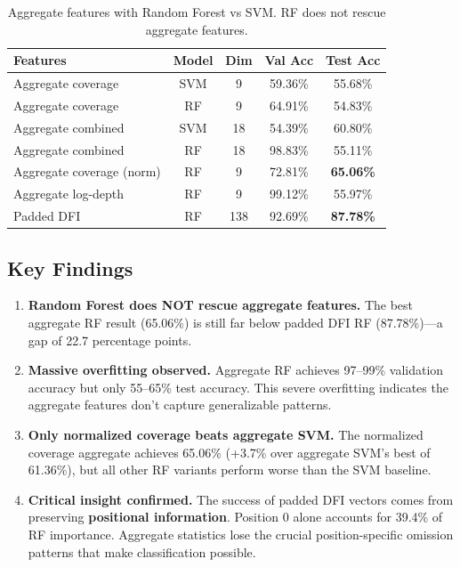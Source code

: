 \documentclass[12pt,a4paper]{article}
\begin{document}
\begin{table}[h]
\centering
\small
\begin{tabular}{lcccc}
\hline
\textbf{Features} & \textbf{Model} & \textbf{Dim} & \textbf{Val Acc} & \textbf{Test Acc} \\
\hline
Aggregate coverage & SVM & 9 & 59.36\% & 55.68\% \\
Aggregate coverage & RF & 9 & 64.91\% & 54.83\% \\
Aggregate combined & SVM & 18 & 54.39\% & 60.80\% \\
Aggregate combined & RF & 18 & 98.83\% & 55.11\% \\
Aggregate coverage (norm) & RF & 9 & 72.81\% & \textbf{65.06\%} \\
Aggregate log-depth & RF & 9 & 99.12\% & 55.97\% \\
\midrule
Padded DFI & RF & 138 & 92.69\% & \textbf{87.78\%} \\
\hline
\end{tabular}
\caption{Aggregate features with Random Forest vs SVM. RF does not rescue aggregate features.}
\label{tab:aggregate_rf}
\end{table}

\subsection{Key Findings}

\begin{enumerate}
\item \textbf{Random Forest does NOT rescue aggregate features.} The best aggregate RF result
      (65.06\%) is still far below padded DFI RF (87.78\%)---a gap of 22.7 percentage points.

\item \textbf{Massive overfitting observed.} Aggregate RF achieves 97--99\% validation accuracy
      but only 55--65\% test accuracy. This severe overfitting indicates the aggregate features
      don't capture generalizable patterns.

\item \textbf{Only normalized coverage beats aggregate SVM.} The normalized coverage aggregate
      achieves 65.06\% (+3.7\% over aggregate SVM's best of 61.36\%), but all other RF variants
      perform worse than the SVM baseline.

\item \textbf{Critical insight confirmed.} The success of padded DFI vectors comes from preserving
      \textbf{positional information}. Position 0 alone accounts for 39.4\% of RF importance.
      Aggregate statistics lose the crucial position-specific omission patterns that make
      classification possible.
\end{enumerate}
\end{document}
